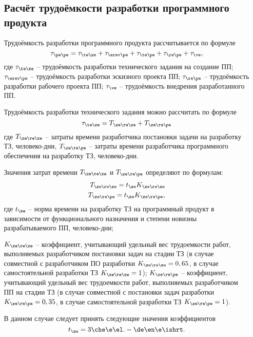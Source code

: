 \subsection{Расчёт трудоёмкости разработки программного продукта}
Трудоёмкость разработки программного продукта рассчитывается по формуле
\begin{equation*}
	\tau_{\pe\pe} = \tau_{\te\ze} + \tau_{\erev\pe} + \tau_{\te\pe} + \tau_{\re\pe} + \tau_{\ve},
\end{equation*}
где $\tau_{\te\ze}$ -- трудоёмкость разработки технического задания на создание ПП; $\tau_{\erev\pe}$ -- трудоёмкость разработки эскизного проекта ПП; $\tau_{\re\pe}$ -- трудоёмкость разработки рабочего проекта ПП; $\tau_{\ve}$ -- трудоёмкость внедрения разработанного ПП.

Трудоёмкость разработки технического задания можно рассчитать по формуле
\begin{equation*}
	\tau_{\te\ze} = T_{\ze\re\ze} + T_{\ze\re\pe}
\end{equation*}
где $T_{\ze\re\ze}$ -- затраты времени разработчика постановки задачи на разработку ТЗ, человеко-дни, $T_{\ze\re\pe}$ -- затраты времени разработчика программного обеспечения на разработку ТЗ, человеко-дни.

Значения затрат времени $T_{\ze\re\ze}$ и $T_{\ze\re\pe}$ определяют по формулам:
\begin{eqnarray*}
	T_{\ze\re\ze} = t_{\ze} K_{\ze\re\ze} \\
	T_{\ze\re\pe} = t_{\ze} K_{\ze\re\pe},
\end{eqnarray*}
где $t_{\ze}$ -- норма времени на разработку ТЗ на программный продукт в зависимости от функционального назначения и степени новизны разрабатываемого ПП, человеко-дни;

$K_{\ze\re\ze}$ -- коэффициент, учитывающий удельный вес трудоемкости работ, выполняемых разработчиком постановки задач на стадии ТЗ (в случае совместной с разработчиком ПО разработки $K_{\ze\re\ze}=0,65$, в случае самостоятельной разработки ТЗ $K_{\ze\re\ze}=1$); 
$K_{\ze\re\pe}$ -- коэффициент, учитывающий удельный вес трудоемкости работ, выполняемых разработчиком ПП на стадии ТЗ (в случае совместной с постановки задач разработки $K_{\ze\re\pe} = 0,35$, в случае самостоятельной разработки ТЗ $K_{\ze\re\pe} = 1$).

В данном случае следует принять следующие значения коэффициентов
\begin{equation}
	t_{\ze} = 3 \che\e\el.-\de\en\e\ishrt.
\end{equation}

